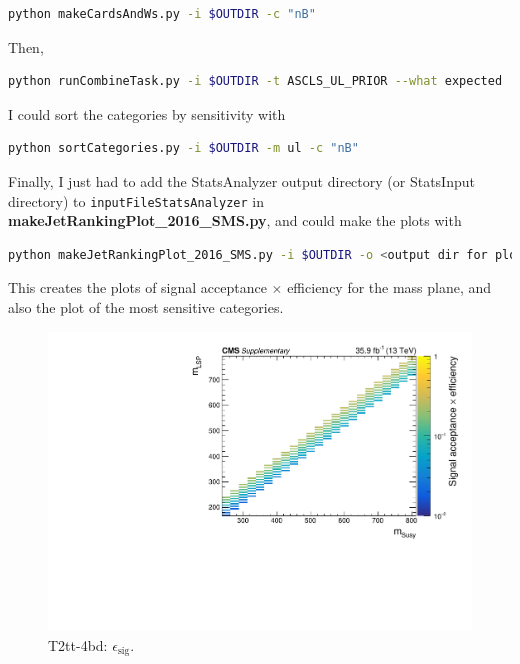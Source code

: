 \begin{lstlisting}[belowskip=-0.7cm, language=sh, numbers=none]
python makeCardsAndWs.py -i $OUTDIR -c "nB"
\end{lstlisting}

Then,

\begin{lstlisting}[belowskip=-0.7cm, language=sh, numbers=none]
python runCombineTask.py -i $OUTDIR -t ASCLS_UL_PRIOR --what expected
\end{lstlisting}

I could sort the \njet categories by sensitivity with

\begin{lstlisting}[belowskip=-0.7cm, language=sh, numbers=none]
python sortCategories.py -i $OUTDIR -m ul -c "nB"
\end{lstlisting}

Finally, I just had to add the StatsAnalyzer output directory (or StatsInput directory) to \texttt{inputFileStatsAnalyzer} in \textbf{makeJetRankingPlot\_2016\_SMS.py}, and could make the plots with

\begin{lstlisting}[belowskip=-0.7cm, language=sh, numbers=none]
python makeJetRankingPlot_2016_SMS.py -i $OUTDIR -o <output dir for plots>
\end{lstlisting}

This creates the plots of signal acceptance $\times$ efficiency for the mass plane, and also the plot of the most sensitive \njet categories. 

\begin{figure}[H]
\centering
\includegraphics[width=120mm]{./sec31/T2tt_sig_acc_eff.pdf}
\caption{T2tt-4bd: $\epsilon_{\mathrm{sig}}$.}
\end{figure}

